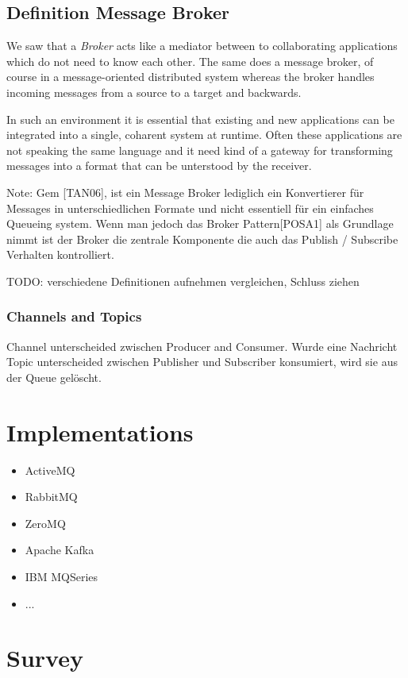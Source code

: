 \subsection{Definition Message Broker}
We saw that a \textit{Broker} acts like a mediator between to collaborating
applications which do not need to know each other. The same does a message
broker, of course in a message-oriented distributed system whereas the broker
handles incoming messages from a source to a target and backwards. 

In such an environment it is essential that existing and new applications can be
integrated into a single, coharent system at runtime. Often these applications
are not speaking the same language and it need kind of a gateway for
transforming messages into a format that can be unterstood by the receiver.
\cite{TAN06}

Note: Gem [TAN06], ist ein Message Broker lediglich ein Konvertierer für
Messages in unterschiedlichen Formate und nicht essentiell für ein einfaches
Queueing system. Wenn man jedoch das Broker Pattern[POSA1] als Grundlage nimmt
ist der Broker die zentrale Komponente die auch das Publish / Subscribe
Verhalten kontrolliert. 

TODO: verschiedene Definitionen aufnehmen vergleichen, Schluss ziehen \\

\subsubsection{Channels and Topics} 
Channel unterscheided zwischen Producer and Consumer. Wurde eine Nachricht
Topic unterscheided zwischen Publisher und Subscriber
konsumiert, wird sie aus der Queue gelöscht. 
\section{Implementations}
\begin{itemize}
	\item ActiveMQ 
	\item RabbitMQ
	\item ZeroMQ
	\item Apache Kafka
	\item IBM MQSeries
	\item ... 
\end{itemize}
\section{Survey}


